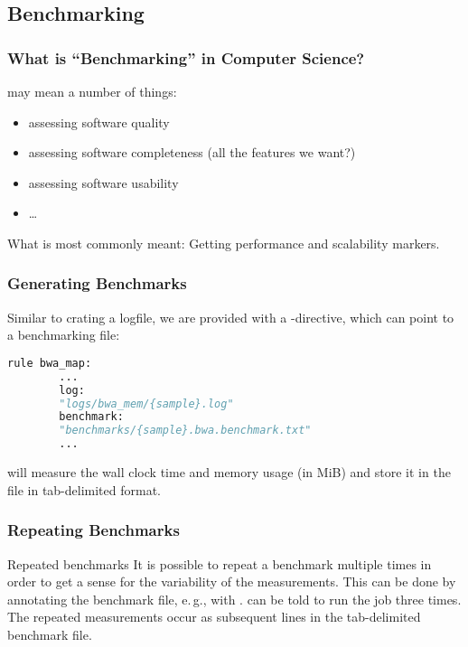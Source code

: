 


\subsection{Benchmarking}

\begin{frame}
	\frametitle{What is ``Benchmarking'' in Computer Science?}
	 may mean a number of things:
	\begin{itemize}[<+->]
		\item assessing software quality
		\item assessing software completeness (all the features we want?)
		\item assessing software usability
		\item \ldots
	\end{itemize}
	\pause
	\begin{docs}
		What is most commonly meant: Getting performance and scalability markers.
	\end{docs}
\end{frame}

\begin{frame}[fragile]
	\frametitle{Generating Benchmarks}
	Similar to crating a logfile, we are provided with a -directive, which can point to a benchmarking file:
	\begin{lstlisting}[language=Python,style=Python]
		rule bwa_map:
		...
		log:
		"logs/bwa_mem/{sample}.log"
		benchmark:
		"benchmarks/{sample}.bwa.benchmark.txt"
		...
	\end{lstlisting} 
	\begin{docs}
		\Snakemake{} will measure the wall clock time and memory usage (in MiB) and store it in the file in tab-delimited format.
	\end{docs}
\end{frame}

\begin{frame}[fragile]
	\frametitle{Repeating Benchmarks}
	\vfill
	\begin{exampleblock}{Repeated benchmarks}
		It is possible to repeat a benchmark multiple times in order to get a sense for the variability of the measurements. This can be done by annotating the benchmark file, e.\,g., with . \Snakemake{} can be told to run the job three times. The repeated measurements occur as subsequent lines in the tab-delimited benchmark file.
	\end{exampleblock}
	\vfill
\end{frame} 

